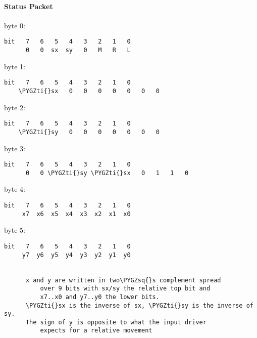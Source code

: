\documentclass[a4paper,8pt,english]{sphinxmanual}
\def\PYGZsq{\char`\'}
\def\PYGZti{\char`\~}
\renewcommand\PYGZsq{\textquotesingle}
\begin{document}
\paragraph{Status Packet}
\label{input/devices/elantech:id9}
byte 0:

\begin{Verbatim}[commandchars=\\\{\}]
bit   7   6   5   4   3   2   1   0
      0   0  sx  sy   0   M   R   L
\end{Verbatim}

byte 1:

\begin{Verbatim}[commandchars=\\\{\}]
bit   7   6   5   4   3   2   1   0
    \PYGZti{}sx   0   0   0   0   0   0   0
\end{Verbatim}

byte 2:

\begin{Verbatim}[commandchars=\\\{\}]
bit   7   6   5   4   3   2   1   0
    \PYGZti{}sy   0   0   0   0   0   0   0
\end{Verbatim}

byte 3:

\begin{Verbatim}[commandchars=\\\{\}]
bit   7   6   5   4   3   2   1   0
      0   0 \PYGZti{}sy \PYGZti{}sx   0   1   1   0
\end{Verbatim}

byte 4:

\begin{Verbatim}[commandchars=\\\{\}]
bit   7   6   5   4   3   2   1   0
     x7  x6  x5  x4  x3  x2  x1  x0
\end{Verbatim}

byte 5:

\begin{Verbatim}[commandchars=\\\{\}]
bit   7   6   5   4   3   2   1   0
     y7  y6  y5  y4  y3  y2  y1  y0


      x and y are written in two\PYGZsq{}s complement spread
          over 9 bits with sx/sy the relative top bit and
          x7..x0 and y7..y0 the lower bits.
      \PYGZti{}sx is the inverse of sx, \PYGZti{}sy is the inverse of sy.
      The sign of y is opposite to what the input driver
          expects for a relative movement
\end{Verbatim}
\end{document}

